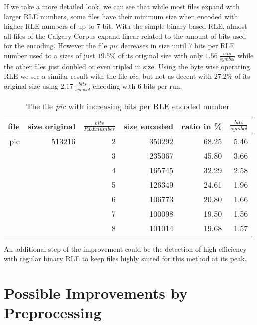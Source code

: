 \par{
If we take a more detailed look, we can see that while most files expand with larger RLE numbers, some files have their minimum size when encoded with higher RLE numbers of up to 7 bit. With the simple binary based RLE, almost all files of the Calgary Corpus expand linear related to the amount of bits used for the encoding. However the file \textit{pic} decreases in size until 7 bits per RLE number used to a sizes of just $19.5 \%$ of its original size with only  $1.56 \: \frac{bits}{symbol}$ while the other files just doubled or even tripled in size. Using the byte wise operating RLE we see a similar result with the file \textit{pic}, but not as decent with $27.2\%$ of its original size using $2.17 \: \frac{bits}{symbol}$ encoding with 6 bits per run.

\begin{table}[h]
	\centering
	\begin{tabular}{r|r|r|r|r|r}	
		file & size original & $\frac{bits}{RLE number}$ & size encoded & ratio in \% & $\frac{bits}{symbol}$\\
		\hline
		pic & 513216 & 2 & 350292 & 68.25 & 5.46 \\
		 & & 3 & 235067 & 45.80 & 3.66\\
		 & & 4 & 165745 & 32.29 & 2.58\\
		 & & 5 & 126349 & 24.61 & 1.96\\
		 & & 6 & 106773 & 20.80 & 1.66\\
		 & & 7 & 100098 & 19.50 & 1.56\\
		 & & 8 & 101014 & 19.68 & 1.57\\		 
	\end{tabular}
	\caption{The file \textit{pic} with increasing bits per RLE encoded number}
	\label{tab:t40 The file pic with increasing bits per RLE encoded number}
\end{table}	
}

\par{
An additional step of the improvement could be the detection of high efficiency with regular binary RLE to keep files highly suited for this method at its peak.
}

\section{Possible Improvements by Preprocessing}
\label{ch:Analysis:sec:Improvements by Preprocessing}

